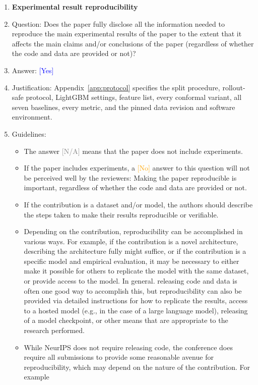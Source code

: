 \documentclass{article}
\providecommand{\answerYes}[1][]{\textcolor{blue}{[Yes] #1}}
\providecommand{\answerNo}[1][]{\textcolor{orange}{[No] #1}}
\providecommand{\answerNA}[1][]{\textcolor{gray}{[N/A] #1}}
\begin{document}
\begin{enumerate}
\item {\bf Experimental result reproducibility}
    \item[] Question: Does the paper fully disclose all the information needed to reproduce the main experimental results of the paper to the extent that it affects the main claims and/or conclusions of the paper (regardless of whether the code and data are provided or not)?
    \item[] Answer: \answerYes{}
    \item[] Justification: Appendix~\ref{app:protocol} specifies the split procedure, rollout-safe protocol, LightGBM settings, feature list, every conformal variant, all seven baselines, every metric, and the pinned data revision and software environment.
    \item[] Guidelines:
    \begin{itemize}
        \item The answer \answerNA{} means that the paper does not include experiments.
        \item If the paper includes experiments, a \answerNo{} answer to this question will not be perceived well by the reviewers: Making the paper reproducible is important, regardless of whether the code and data are provided or not.
        \item If the contribution is a dataset and\slash or model, the authors should describe the steps taken to make their results reproducible or verifiable.
        \item Depending on the contribution, reproducibility can be accomplished in various ways. For example, if the contribution is a novel architecture, describing the architecture fully might suffice, or if the contribution is a specific model and empirical evaluation, it may be necessary to either make it possible for others to replicate the model with the same dataset, or provide access to the model. In general. releasing code and data is often one good way to accomplish this, but reproducibility can also be provided via detailed instructions for how to replicate the results, access to a hosted model (e.g., in the case of a large language model), releasing of a model checkpoint, or other means that are appropriate to the research performed.
        \item While NeurIPS does not require releasing code, the conference does require all submissions to provide some reasonable avenue for reproducibility, which may depend on the nature of the contribution. For example
        \begin{enumerate}

\end{enumerate}
\end{itemize}
\end{enumerate}
\end{document}
